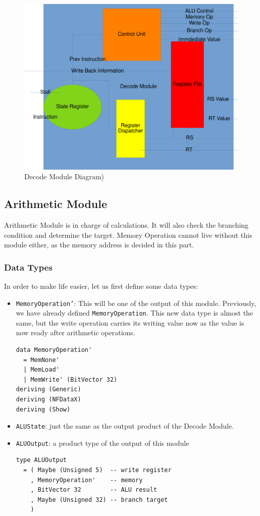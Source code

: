 \documentclass[a4paper,12pt, oneside]{book}
\begin{document}
\begin{figure}[H]
	\centering
	\includegraphics[width=\linewidth]{dm}
	\caption{Decode Module Diagram)}
\end{figure}
\subsection{Arithmetic Module}
Arithmetic Module is in charge of calculations. It will also check the branching condition and determine the target. Memory Operation cannot live without this module either, as the memory address is decided in this part.
\subsubsection{Data Types}
In order to make life easier, let us first define some data types:
\begin{itemize}
\item \texttt{MemoryOperation'}: This will be one of the output of this module. Previously, we have already defined \texttt{MemoryOperation}. This new data type is almost the same, but the write operation carries its writing value now as the value is now ready after arithmetic operations.
\begin{verbatim}
data MemoryOperation'
  = MemNone'
  | MemLoad'
  | MemWrite' (BitVector 32)
deriving (Generic)
deriving (NFDataX)
deriving (Show)
\end{verbatim}
\item  \texttt{ALUState}: just the same as the output product of the Decode Module.
\item  \texttt{ALUOutput}: a product type of the output of this module
\begin{verbatim}
type ALUOutput
  = ( Maybe (Unsigned 5)  -- write register
    , MemoryOperation'    -- memory
    , BitVector 32        -- ALU result
    , Maybe (Unsigned 32) -- branch target
    )
\end{verbatim}
\end{itemize}
\end{document}
